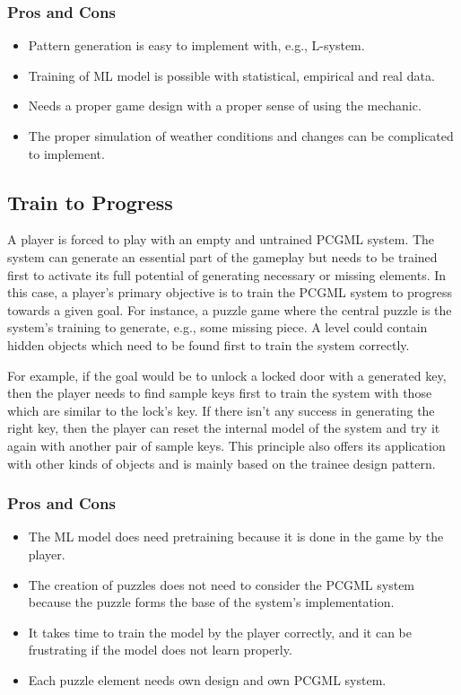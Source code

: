 \documentclass[MGS,Master,english]{twbook}%
\begin{document}
\subsubsection{Pros and Cons}
\begin{itemize}
	\item Pattern generation is easy to implement with, e.g., L-system.
	\item Training of ML model is possible with statistical, empirical and real data.
	\item Needs a proper game design with a proper sense of using the mechanic.
	\item The proper simulation of weather conditions and changes can be complicated to implement.
\end{itemize}


\subsection{Train to Progress} \label{idea::trainToProgress}
A player is forced to play with an empty and untrained PCGML system. The system can generate an essential part of the gameplay but needs to be trained first to activate its full potential of generating necessary or missing elements. In this case, a player’s primary objective is to train the PCGML system to progress towards a given goal. For instance, a puzzle game where the central puzzle is the system’s training to generate, e.g., some missing piece. A level could contain hidden objects which need to be found first to train the system correctly. 

For example, if the goal would be to unlock a locked door with a generated key, then the player needs to find sample keys first to train the system with those which are similar to the lock's key. If there isn’t any success in generating the right key, then the player can reset the internal model of the system and try it again with another pair of sample keys. This principle also offers its application with other kinds of objects and is mainly based on the trainee design pattern.

\subsubsection{Pros and Cons}
\begin{itemize}
	\item The ML model does need pretraining because it is done in the game by the player.
	\item The creation of puzzles does not need to consider the PCGML system because the puzzle forms the base of the system's implementation.
	\item It takes time to train the model by the player correctly, and it can be frustrating if the model does not learn properly.
	\item Each puzzle element needs own design and own PCGML system.
\end{itemize}
\end{document}
